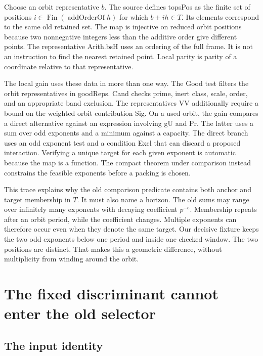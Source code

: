 \documentclass[12pt,letterpaper]{article}
\DeclareRobustCommand{\id}[1]{\mbox{\small\ttfamily #1}}
\begin{document}
Choose an orbit representative $b$. The source defines \id{topsPos} as the finite set of positions $i\in\operatorname{Fin}(\operatorname{addOrderOf}h)$ for which $b+ih\in T$. Its elements correspond to the same old retained set. The map is injective on reduced orbit positions because two nonnegative integers less than the additive order give different points. The representative \id{Arith.bsH} uses an ordering of the full frame. It is not an instruction to find the nearest retained point. Local parity is parity of a coordinate relative to that representative.

The local gain uses these data in more than one way. The Good test filters the orbit representatives in \id{goodReps}. \id{Cand} checks prime, inert class, scale, order, and an appropriate band exclusion. The representatives \id{VV} additionally require a bound on the weighted orbit contribution \id{Sig}. On a used orbit, the gain compares a direct alternative against an expression involving \id{gU} and \id{Pr}. The latter uses a sum over odd exponents and a minimum against a capacity. The direct branch uses an odd exponent test and a condition \id{Excl} that can discard a proposed interaction. Verifying a unique target for each given exponent is automatic because the map is a function. The compact theorem under comparison instead constrains the feasible exponents before a packing is chosen.

This trace explains why the old comparison predicate contains both anchor and target membership in $T$. It must also name a horizon. The old sums may range over infinitely many exponents with decaying coefficient $p^{-e}$. Membership repeats after an orbit period, while the coefficient changes. Multiple exponents can therefore occur even when they denote the same target. Our decisive fixture keeps the two odd exponents below one period and inside one checked window. The two positions are distinct. That makes this a geometric difference, without multiplicity from winding around the orbit.

\section{The fixed discriminant cannot enter the old selector}
\label{sec:rank}

\subsection{The input identity}
\end{document}
